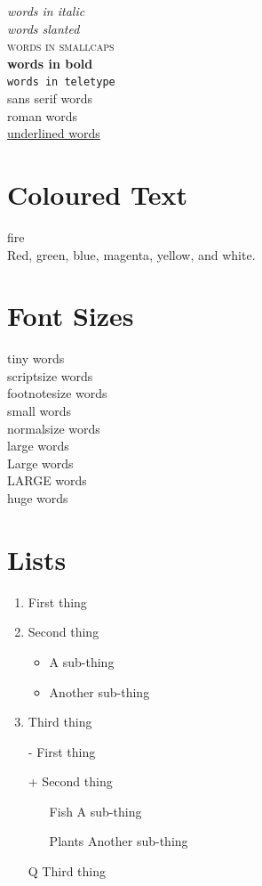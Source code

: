 \documentclass[a4paper, 12pt]{report}
\begin{document}
\textit{words in italic}\\
\textsl{words slanted}\\
\textsc{words in smallcaps}\\
\textbf{words in bold}\\
\texttt{words in teletype}\\
\textsf{sans serif words}\\
\textrm{roman words}\\
\underline{underlined words}

\section{Coloured Text}

{\color{red}fire} \\
{\color{red}Red}, {\color{green}green}, {\color{blue}blue}, {\color{magenta}magenta}, {\color{yellow}yellow}, and {\color{white}white}.

\section{Font Sizes}

{\tiny tiny words}\\
{\scriptsize scriptsize words}\\
{\footnotesize footnotesize words}\\
{\small small words}\\
{\normalsize normalsize words}\\
{\large large words}\\
{\Large Large words}\\
{\LARGE LARGE words}\\
{\huge huge words}


\section{Lists}

\begin{enumerate}
\item First thing
\item Second thing
\begin{itemize}
\item A sub-thing
\item Another sub-thing
\end{itemize}
\item Third thing
\end{enumerate}


\begin{itemize}
\item[-] First thing
\item[+] Second thing
\begin{itemize}
\item[Fish] A sub-thing
\item[Plants] Another sub-thing
\end{itemize}
\item[Q] Third thing
\end{itemize}
\end{document}
